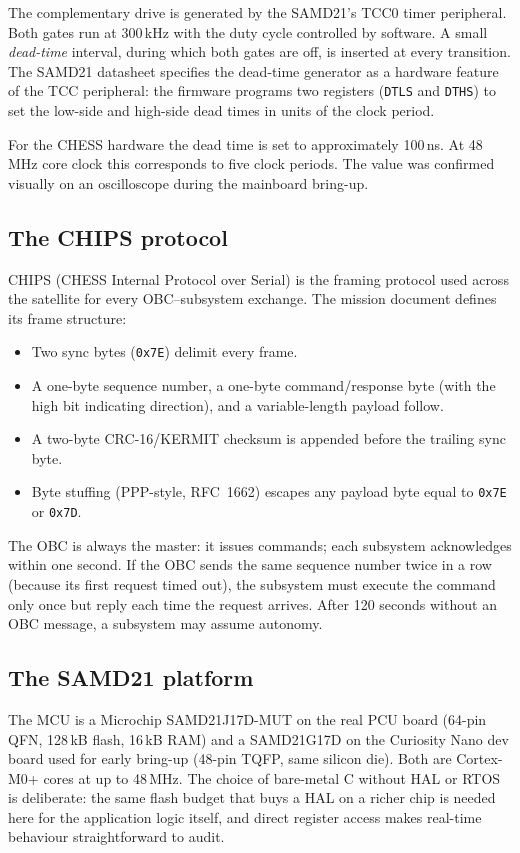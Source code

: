 The complementary drive is generated by the SAMD21's TCC0 timer
peripheral. Both gates run at 300\,kHz with the duty cycle
controlled by software. A small \textit{dead-time} interval, during
which both gates are off, is inserted at every transition. The
SAMD21 datasheet specifies the dead-time generator as a hardware
feature of the TCC peripheral: the firmware programs two registers
(\texttt{DTLS} and \texttt{DTHS}) to set the low-side and
high-side dead times in units of the clock period.

For the CHESS hardware the dead time is set to approximately
100\,ns. At 48\,MHz core clock this corresponds to five clock
periods. The value was confirmed visually on an oscilloscope during
the mainboard bring-up.

\subsection{The CHIPS protocol}

CHIPS (CHESS Internal Protocol over Serial) is the framing protocol
used across the satellite for every OBC--subsystem exchange. The
mission document defines its frame structure:

\begin{itemize}
\item Two sync bytes (\texttt{0x7E}) delimit every frame.
\item A one-byte sequence number, a one-byte command/response
byte (with the high bit indicating direction), and a variable-length
payload follow.
\item A two-byte CRC-16/KERMIT checksum is appended before the
trailing sync byte.
\item Byte stuffing (PPP-style, RFC~1662) escapes any payload byte
equal to \texttt{0x7E} or \texttt{0x7D}.
\end{itemize}

The OBC is always the master: it issues commands; each subsystem
acknowledges within one second. If the OBC sends the same sequence
number twice in a row (because its first request timed out), the
subsystem must execute the command only once but reply each time
the request arrives. After 120 seconds without an OBC message, a
subsystem may assume autonomy.

\subsection{The SAMD21 platform}

The MCU is a Microchip SAMD21J17D-MUT on the real PCU board
(64-pin QFN, 128\,kB flash, 16\,kB RAM) and a SAMD21G17D on the
Curiosity Nano dev board used for early bring-up (48-pin TQFP, same
silicon die). Both are Cortex-M0+ cores at up to 48\,MHz. The
choice of bare-metal C without HAL or RTOS is deliberate: the same
flash budget that buys a HAL on a richer chip is needed here for
the application logic itself, and direct register access makes
real-time behaviour straightforward to audit.

